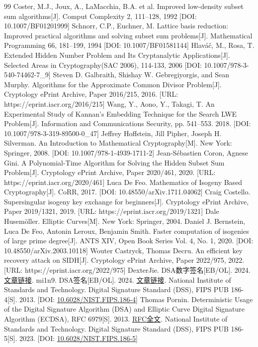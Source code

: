 \documentclass{book}
\numberwithin{equation}{subsubsection}
\begin{document}
\begin{thebibliography}{99}
     Coster, M.J., Joux, A., LaMacchia, B.A. et al. Improved low-density subset sum algorithms[J]. Comput Complexity 2, 111–128, 1992 [DOI: 10.1007/BF01201999]
     Schnorr, C.P., Euchner, M. Lattice basis reduction: Improved practical algorithms and solving subset sum problems[J]. Mathematical Programming 66, 181–199, 1994 [DOI: 10.1007/BF01581144]
     Hlaváč, M., Rosa, T. Extended Hidden Number Problem and Its Cryptanalytic Applications[J]. Selected Areas in Cryptography(SAC 2006), 114-133, 2006 [DOI: 10.1007/978-3-540-74462-7\_9]
     Steven D. Galbraith, Shishay W. Gebregiyorgis, and Sean Murphy. Algorithms for the Approximate Common Divisor Problem[J]. Cryptology {ePrint} Archive, Paper 2016/215, 2016. [URL: https://eprint.iacr.org/2016/215]
     Wang, Y., Aono, Y., Takagi, T. An Experimental Study of Kannan’s Embedding Technique for the Search LWE Problem[J]. Information and Communications Security, pp. 541–553. 2018. [DOI: 10.1007/978-3-319-89500-0\_47]
     Jeffrey Hoffstein, Jill Pipher, Joseph H. Silverman. An Introduction to Mathematical Cryptography[M]. New York: Springer, 2008. [DOI: 10.1007/978-1-4939-1711-2]
     Jean-Sébastien Coron, Agnese Gini. A Polynomial-Time Algorithm for Solving the Hidden Subset Sum Problem[J]. Cryptology {ePrint} Archive, Paper 2020/461, 2020. [URL: https://eprint.iacr.org/2020/461]
     Luca De Feo. Mathematics of Isogeny Based Cryptography[J]. CoRR, 2017. [DOI: 10.48550/arXiv.1711.04062]
     Craig Costello. Supersingular isogeny key exchange for beginners[J]. Cryptology {ePrint} Archive, Paper 2019/1321, 2019. [URL: https://eprint.iacr.org/2019/1321]
     Dale Husemöller. Elliptic Curves[M]. New York: Springer, 2004.
     Daniel J. Bernstein, Luca De Feo, Antonin Leroux, Benjamin Smith. Faster computation of isogenies of large prime degree[J]. ANTS XIV, Open Book Series Vol. 4, No. 1, 2020. [DOI: 10.48550/arXiv.2003.10118]
     Wouter Castryck, Thomas Decru. An efficient key recovery attack on SIDH[J]. Cryptology {ePrint} Archive, Paper 2022/975, 2022. [URL: https://eprint.iacr.org/2022/975]
     DexterJie. DSA数字签名[EB/OL]. 2024. \href{https://dexterjie.github.io/2024/07/26/DSA/}{文章链接}.
     mi1n9. DSA签名[EB/OL]. 2024. \href{https://mi1n9.github.io/2024/08/17/DSA\%E7\%AD\%BE\%E5\%90\%8D/}{文章链接}.
     National Institute of Standards and Technology. Digital Signature Standard (DSS), FIPS PUB 186-4[S]. 2013. [DOI: \href{https://doi.org/10.6028/NIST.FIPS.186-4}{10.6028/NIST.FIPS.186-4}]
     Thomas Pornin. Deterministic Usage of the Digital Signature Algorithm (DSA) and Elliptic Curve Digital Signature Algorithm (ECDSA), RFC 6979[S]. 2013. \href{https://www.rfc-editor.org/rfc/rfc6979}{RFC全文}.
     National Institute of Standards and Technology. Digital Signature Standard (DSS), FIPS PUB 186-5[S]. 2023. [DOI: \href{https://doi.org/10.6028/NIST.FIPS.186-5}{10.6028/NIST.FIPS.186-5}]
\end{thebibliography}
\end{document}
